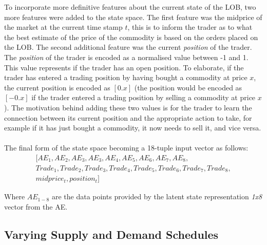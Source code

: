 \documentclass[ %
                    author={Ashwinder Khurana},
                supervisor={Prof Dave Cliff},
                    degree={MEng},
                     title={The Deeply Reinforced Trader},
                  subtitle={},
                      type={enterprise},
                      year={2020} ]{dissertation}
\begin{document}
{To incorporate more definitive features about the current state of the LOB, two more features were added to the state space. The first feature was the midprice of the market at the current time stamp $t$, this is to inform the trader as to what the best estimate of the price of the commodity is based on the orders placed on the LOB. The second additional feature was the current \textit{position} of the trader. The \textit{position} of the trader is encoded as a normalised value between -1 and 1. This value represents if the trader has an open position. To elaborate, if the trader has entered a trading position by having bought a commodity at price $x$, the current position is encoded as $[0.x]$ (the position would be encoded as $[-0.x]$ if the trader entered a trading position by selling a commodity at price $x$). The motivation behind adding these two values is for the trader to learn the connection between its current position and the appropriate action to take, for example if it has just bought a commodity, it now needs to sell it, and vice versa. 
\\
\\
The final form of the state space becoming a 18-tuple input vector as follows:
\begin{equation}
\label{Final state}
\begin{split}
[AE_1,AE_2,AE_3,AE_3,AE_4,AE_5, AE_6, AE_7, AE_8, \\Trade_1,Trade_2, Trade_3, Trade_4, Trade_5, Trade_6, Trade_7, Trade_8,\\ midprice_t, position_t]  
\end{split}
\end{equation}

\noindent
Where $AE_{1-8}$ are the data points provided by the latent state representation \textit{1x8} vector from the AE. 

%
\subsection{Varying Supply and Demand Schedules}
}
\end{document}

